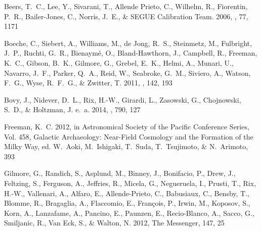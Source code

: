 \documentclass[12pt, preprint]{aastex}
\begin{document}
\begin{thebibliography}{24}
{Beers}, T.~C., {Lee}, Y., {Sivarani}, T., {Allende Prieto}, C., {Wilhelm}, R.,
  {Fiorentin}, P.~R., {Bailer-Jones}, C., {Norris}, J.~E., \& {SEGUE
  Calibration Team}. 2006, \memsai, 77, 1171

{Boeche}, C., {Siebert}, A., {Williams}, M., {de Jong}, R.~S., {Steinmetz}, M.,
  {Fulbright}, J.~P., {Ruchti}, G.~R., {Bienaym{\'e}}, O., {Bland-Hawthorn},
  J., {Campbell}, R., {Freeman}, K.~C., {Gibson}, B.~K., {Gilmore}, G.,
  {Grebel}, E.~K., {Helmi}, A., {Munari}, U., {Navarro}, J.~F., {Parker},
  Q.~A., {Reid}, W., {Seabroke}, G.~M., {Siviero}, A., {Watson}, F.~G., {Wyse},
  R.~F.~G., \& {Zwitter}, T. 2011, \aj, 142, 193

{Bovy}, J., {Nidever}, D.~L., {Rix}, H.-W., {Girardi}, L., {Zasowski}, G.,
  {Chojnowski}, S.~D., \& {Holtzman}, J. e.~a. 2014, \apj, 790, 127
  

{Freeman}, K.~C. 2012, in Astronomical Society of the Pacific Conference
  Series, Vol. 458, Galactic Archaeology: Near-Field Cosmology and the
  Formation of the Milky Way, ed. W.~{Aoki}, M.~{Ishigaki}, T.~{Suda},
  T.~{Tsujimoto}, \& N.~{Arimoto}, 393

{Gilmore}, G., {Randich}, S., {Asplund}, M., {Binney}, J., {Bonifacio}, P.,
  {Drew}, J., {Feltzing}, S., {Ferguson}, A., {Jeffries}, R., {Micela}, G.,
  {Negueruela}, I., {Prusti}, T., {Rix}, H.-W., {Vallenari}, A., {Alfaro}, E.,
  {Allende-Prieto}, C., {Babusiaux}, C., {Bensby}, T., {Blomme}, R.,
  {Bragaglia}, A., {Flaccomio}, E., {Fran{\c c}ois}, P., {Irwin}, M.,
  {Koposov}, S., {Korn}, A., {Lanzafame}, A., {Pancino}, E., {Paunzen}, E.,
  {Recio-Blanco}, A., {Sacco}, G., {Smiljanic}, R., {Van Eck}, S., \& {Walton},
  N. 2012, The Messenger, 147, 25


\end{thebibliography}
\end{document}
